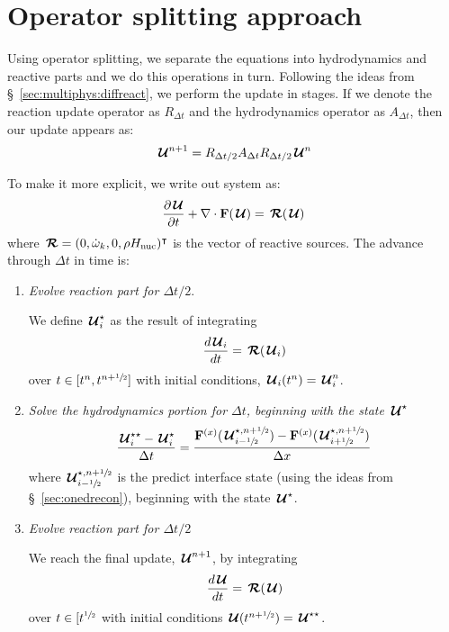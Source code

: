 \section{Operator splitting approach}

Using operator splitting, we separate the equations into hydrodynamics
and reactive parts and we do this operations in turn.  Following the
ideas from \S~\ref{sec:multiphys:diffreact}, we perform the update
in stages.  If we denote the reaction update operator as $R_{\Delta t}$
and the hydrodynamics operator as $A_{\Delta t}$, then our update 
appears as:
\begin{equation}
  {\,\boldsymbol{\mathcal{U}}}^{n+1} = R_{\Delta t/2} A_{\Delta t} R_{\Delta t/2} {\,\boldsymbol{\mathcal{U}}}^n
\end{equation}

To make it more explicit, we write out system as:
\begin{equation}
{\frac{{\partial{\,\boldsymbol{\mathcal{U}}}}}{\partial t}} + \nabla \cdot {\bf F}({\,\boldsymbol{\mathcal{U}}}) = {\,\boldsymbol{\mathcal{R}}}({\,\boldsymbol{\mathcal{U}}})
\end{equation}
where ${\,\boldsymbol{\mathcal{R}}} = (0, {\dot{\omega}}_k, 0, \rho {H_\mathrm{nuc}})^\intercal$ is the vector
of reactive sources.  The advance through $\Delta t$ in time is:
\begin{enumerate}
\item {\em Evolve reaction part for $\Delta t/2$}.

  We define ${\,\boldsymbol{\mathcal{U}}}_i^\star$ as the result of integrating
  \begin{equation}
    \frac{d{\,\boldsymbol{\mathcal{U}}}_i}{dt} = {\,\boldsymbol{\mathcal{R}}}({\,\boldsymbol{\mathcal{U}}}_i)
  \end{equation}
  over $t \in [t^n, t^{n+{\sfrac{1}{2}}}]$ with initial conditions, 
  ${\,\boldsymbol{\mathcal{U}}}_i(t^n) = {\,\boldsymbol{\mathcal{U}}}_i^n$.

\item {\em Solve the hydrodynamics portion for $\Delta t$, beginning
    with the state ${\,\boldsymbol{\mathcal{U}}}^\star$}
   \begin{equation}
     \frac{{\,\boldsymbol{\mathcal{U}}}^{\star\star}_i - {\,\boldsymbol{\mathcal{U}}}^\star_i}{\Delta t} =
      \frac{{\bf F}^{(x)}({\,\boldsymbol{\mathcal{U}}}^{\star,n+{\sfrac{1}{2}}}_{i-{\sfrac{1}{2}}}) - {\bf F}^{(x)}({\,\boldsymbol{\mathcal{U}}}^{\star,n+{\sfrac{1}{2}}}_{i+{\sfrac{1}{2}}})}{\Delta x}
   \end{equation}
  where ${\,\boldsymbol{\mathcal{U}}}^{\star,n+{\sfrac{1}{2}}}_{i-{\sfrac{1}{2}}}$ is the predict interface state
  (using the ideas from \S~\ref{sec:onedrecon}), beginning with the state
  ${\,\boldsymbol{\mathcal{U}}}^\star$.

\item {\em Evolve reaction part for $\Delta t/2$}

  We reach the final update, ${\,\boldsymbol{\mathcal{U}}}^{n+1}$, by integrating
  \begin{equation}
    \frac{d{\,\boldsymbol{\mathcal{U}}}}{dt} = {\,\boldsymbol{\mathcal{R}}}({\,\boldsymbol{\mathcal{U}}})
  \end{equation}
  over $t \in [t^{{\sfrac{1}{2}}}$ with initial conditions
    ${\,\boldsymbol{\mathcal{U}}}(t^{n+{\sfrac{1}{2}}}) = {\,\boldsymbol{\mathcal{U}}}^{\star\star}$.

\end{enumerate}



